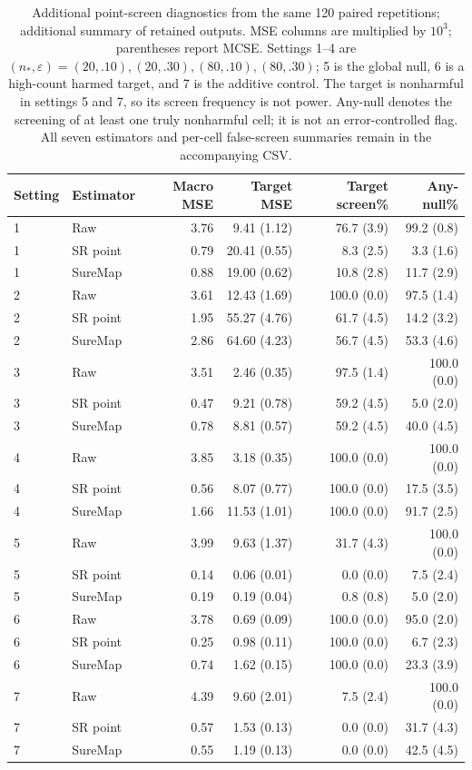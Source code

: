 \begin{table}[t]
\centering\small
\caption{Additional point-screen diagnostics from the same 120 paired repetitions; additional summary of retained outputs. MSE columns are multiplied by $10^3$; parentheses report MCSE. Settings 1--4 are $(n_*,\varepsilon)=(20,.10),(20,.30),(80,.10),(80,.30)$; 5 is the global null, 6 is a high-count harmed target, and 7 is the additive control. The target is nonharmful in settings 5 and 7, so its screen frequency is not power. Any-null denotes the screening of at least one truly nonharmful cell; it is not an error-controlled flag. All seven estimators and per-cell false-screen summaries remain in the accompanying CSV.}\label{tab:pointcontrols}
\begin{tabular}{llrrrr}
\toprule
Setting & Estimator & Macro MSE & Target MSE & Target screen\% & Any-null\% \\
\midrule
1 & Raw & 3.76 & 9.41 (1.12) & 76.7 (3.9) & 99.2 (0.8) \\
1 & SR point & 0.79 & 20.41 (0.55) & 8.3 (2.5) & 3.3 (1.6) \\
1 & SureMap & 0.88 & 19.00 (0.62) & 10.8 (2.8) & 11.7 (2.9) \\
2 & Raw & 3.61 & 12.43 (1.69) & 100.0 (0.0) & 97.5 (1.4) \\
2 & SR point & 1.95 & 55.27 (4.76) & 61.7 (4.5) & 14.2 (3.2) \\
2 & SureMap & 2.86 & 64.60 (4.23) & 56.7 (4.5) & 53.3 (4.6) \\
3 & Raw & 3.51 & 2.46 (0.35) & 97.5 (1.4) & 100.0 (0.0) \\
3 & SR point & 0.47 & 9.21 (0.78) & 59.2 (4.5) & 5.0 (2.0) \\
3 & SureMap & 0.78 & 8.81 (0.57) & 59.2 (4.5) & 40.0 (4.5) \\
4 & Raw & 3.85 & 3.18 (0.35) & 100.0 (0.0) & 100.0 (0.0) \\
4 & SR point & 0.56 & 8.07 (0.77) & 100.0 (0.0) & 17.5 (3.5) \\
4 & SureMap & 1.66 & 11.53 (1.01) & 100.0 (0.0) & 91.7 (2.5) \\
5 & Raw & 3.99 & 9.63 (1.37) & 31.7 (4.3) & 100.0 (0.0) \\
5 & SR point & 0.14 & 0.06 (0.01) & 0.0 (0.0) & 7.5 (2.4) \\
5 & SureMap & 0.19 & 0.19 (0.04) & 0.8 (0.8) & 5.0 (2.0) \\
6 & Raw & 3.78 & 0.69 (0.09) & 100.0 (0.0) & 95.0 (2.0) \\
6 & SR point & 0.25 & 0.98 (0.11) & 100.0 (0.0) & 6.7 (2.3) \\
6 & SureMap & 0.74 & 1.62 (0.15) & 100.0 (0.0) & 23.3 (3.9) \\
7 & Raw & 4.39 & 9.60 (2.01) & 7.5 (2.4) & 100.0 (0.0) \\
7 & SR point & 0.57 & 1.53 (0.13) & 0.0 (0.0) & 31.7 (4.3) \\
7 & SureMap & 0.55 & 1.19 (0.13) & 0.0 (0.0) & 42.5 (4.5) \\
\bottomrule
\end{tabular}
\end{table}
